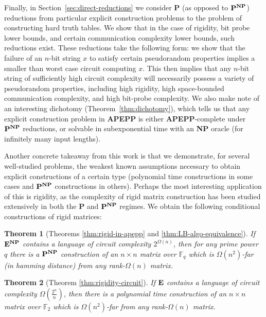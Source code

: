 \documentclass[11pt]{article}
\newtheorem*{theorem*}{Theorem}
\def\cl{\bf}
\begin{document}
Finally, in Section~\ref{sec:direct-reductions} we consider {\cl P} (as opposed to ${\cl P}^{\cl NP}$) reductions from particular explicit construction problems to the problem of constructing hard truth tables. We show that in the case of rigidity, bit probe lower bounds, and certain communication complexity lower bounds, such reductions exist. These reductions take the following form: we show that the failure of an $n$-bit string $x$ to satisfy certain pseudorandom properties implies a smaller than worst case circuit computing $x$. This then implies that any $n$-bit string of sufficiently high circuit complexity will necessarily possess a variety of pseudorandom properties, including high rigidity, high space-bounded communication complexity, and high bit-probe complexity. We also make note of an interesting dichotomy (Theorem~\ref{thm:dichotomy}), which tells us that any explicit construction problem in {\cl APEPP} is either {\cl APEPP}-complete under ${\cl P}^{\cl NP}$ reductions, or solvable in subexponential time with an {\cl NP} oracle (for infinitely many input lengths).

Another concrete takeaway from this work is that we demonstrate, for several well-studied problems, the weakest known assumptions necessary to obtain explicit constructions of a certain type (polynomial time constructions in some cases and ${\cl P}^{\cl NP}$ constructions in others). Perhaps the most interesting application of this is rigidity, as the complexity of rigid matrix construction has been studied extensively in both the {\cl P} and ${\cl P}^{\cl NP}$ regimes. We obtain the following conditional constructions of rigid matrices:

\begin{theorem*}[Theorems \ref{thm:rigid-in-apepp} and \ref{thm:LB-algo-equivalence}]
If ${\cl E}^{\cl NP}$ contains a language of circuit complexity $2^{\Omega(n)}$, then for any prime power $q$ there is a ${\cl P}^{\cl NP}$ construction of an $n \times n$ matrix over $\mathbb{F}_q$ which is $\Omega(n^2)$-far (in hamming distance) from any rank-$\Omega(n)$ matrix.
\end{theorem*}

\begin{theorem*}[Theorem \ref{thm:rigidity-circuit}]
If ${\cl E}$ contains a language of circuit complexity $\Omega(\frac{2^n}{n})$, then there is a polynomial time construction of an $n \times n$ matrix over $\mathbb{F}_2$ which is $\Omega(n^2)$-far from any rank-$\Omega(n)$ matrix.
\end{theorem*}
\end{document}

